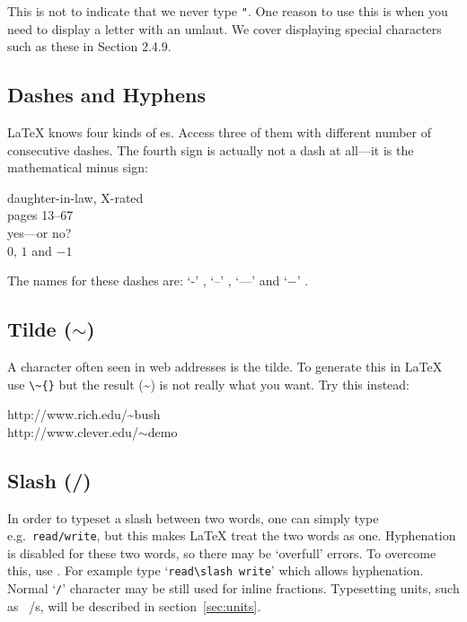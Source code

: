 This is not to indicate that we never type \verb|"|. One reason to use this is
when you need to display a letter with an umlaut. We cover displaying
special characters such as these in Section 2.4.9.
\subsection{Dashes and Hyphens}

\LaTeX{} knows four kinds of es. Access three of
them with different number of consecutive dashes. The fourth sign
is actually not a dash at all---it is the mathematical minus sign: \index{-}
\index{--} \index{---}  

\begin{example}
daughter-in-law, X-rated\\
pages 13--67\\
yes---or no? \\
$0$, $1$ and $-1$
\end{example}
The names for these dashes are:
`-' , `--' , `---'  and
`$-$' .

\subsection{Tilde (\(\sim\))}
A character often seen in web addresses is the tilde. To generate
this in \LaTeX{} use \verb|\~{}| but the result (\~{}) is not really
what you want. Try this instead:

\begin{example}
http://www.rich.edu/\~{}bush \\
http://www.clever.edu/$\sim$demo
\end{example}

\subsection{Slash (/)}
In order to typeset a slash between two words, one can simply type e.g.\
\texttt{read/write}, but this makes \LaTeX{} treat the two words as one.
Hyphenation is disabled for these two words, so there may be `overfull'
errors.  To overcome this, use \ci{slash}.  For example type
`\verb|read\slash write|' which allows hyphenation.  Normal `\texttt{/}'
character may be still used for inline fractions. Typesetting units,
such as \unit[per-mode = symbol]{\mebi\byte\per\s}, will be described in
section~\ref{sec:units}.

